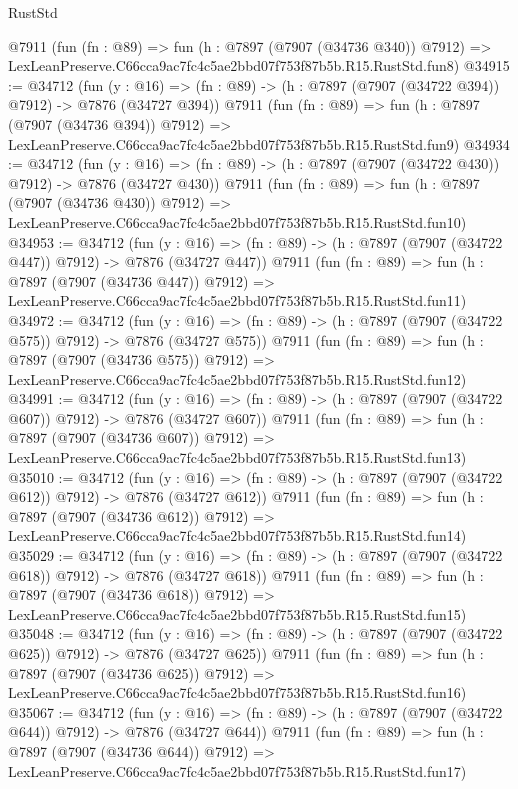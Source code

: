\begin{lexlean}{RustStd}
\begin{coremodule}
    @7911
    (fun (fn : @89) =>
    fun (h : @7897 (@7907 (@34736 @340)) @7912) =>
    LexLeanPreserve.C66cca9ac7fc4c5ae2bbd07f753f87b5b.R15.RustStd.fun8)
@34915 := @34712
    (fun (y : @16) => (fn : @89) -> (h : @7897 (@7907 (@34722 @394)) @7912) -> @7876 (@34727 @394))
    @7911
    (fun (fn : @89) =>
    fun (h : @7897 (@7907 (@34736 @394)) @7912) =>
    LexLeanPreserve.C66cca9ac7fc4c5ae2bbd07f753f87b5b.R15.RustStd.fun9)
@34934 := @34712
    (fun (y : @16) => (fn : @89) -> (h : @7897 (@7907 (@34722 @430)) @7912) -> @7876 (@34727 @430))
    @7911
    (fun (fn : @89) =>
    fun (h : @7897 (@7907 (@34736 @430)) @7912) =>
    LexLeanPreserve.C66cca9ac7fc4c5ae2bbd07f753f87b5b.R15.RustStd.fun10)
@34953 := @34712
    (fun (y : @16) => (fn : @89) -> (h : @7897 (@7907 (@34722 @447)) @7912) -> @7876 (@34727 @447))
    @7911
    (fun (fn : @89) =>
    fun (h : @7897 (@7907 (@34736 @447)) @7912) =>
    LexLeanPreserve.C66cca9ac7fc4c5ae2bbd07f753f87b5b.R15.RustStd.fun11)
@34972 := @34712
    (fun (y : @16) => (fn : @89) -> (h : @7897 (@7907 (@34722 @575)) @7912) -> @7876 (@34727 @575))
    @7911
    (fun (fn : @89) =>
    fun (h : @7897 (@7907 (@34736 @575)) @7912) =>
    LexLeanPreserve.C66cca9ac7fc4c5ae2bbd07f753f87b5b.R15.RustStd.fun12)
@34991 := @34712
    (fun (y : @16) => (fn : @89) -> (h : @7897 (@7907 (@34722 @607)) @7912) -> @7876 (@34727 @607))
    @7911
    (fun (fn : @89) =>
    fun (h : @7897 (@7907 (@34736 @607)) @7912) =>
    LexLeanPreserve.C66cca9ac7fc4c5ae2bbd07f753f87b5b.R15.RustStd.fun13)
@35010 := @34712
    (fun (y : @16) => (fn : @89) -> (h : @7897 (@7907 (@34722 @612)) @7912) -> @7876 (@34727 @612))
    @7911
    (fun (fn : @89) =>
    fun (h : @7897 (@7907 (@34736 @612)) @7912) =>
    LexLeanPreserve.C66cca9ac7fc4c5ae2bbd07f753f87b5b.R15.RustStd.fun14)
@35029 := @34712
    (fun (y : @16) => (fn : @89) -> (h : @7897 (@7907 (@34722 @618)) @7912) -> @7876 (@34727 @618))
    @7911
    (fun (fn : @89) =>
    fun (h : @7897 (@7907 (@34736 @618)) @7912) =>
    LexLeanPreserve.C66cca9ac7fc4c5ae2bbd07f753f87b5b.R15.RustStd.fun15)
@35048 := @34712
    (fun (y : @16) => (fn : @89) -> (h : @7897 (@7907 (@34722 @625)) @7912) -> @7876 (@34727 @625))
    @7911
    (fun (fn : @89) =>
    fun (h : @7897 (@7907 (@34736 @625)) @7912) =>
    LexLeanPreserve.C66cca9ac7fc4c5ae2bbd07f753f87b5b.R15.RustStd.fun16)
@35067 := @34712
    (fun (y : @16) => (fn : @89) -> (h : @7897 (@7907 (@34722 @644)) @7912) -> @7876 (@34727 @644))
    @7911
    (fun (fn : @89) =>
    fun (h : @7897 (@7907 (@34736 @644)) @7912) =>
    LexLeanPreserve.C66cca9ac7fc4c5ae2bbd07f753f87b5b.R15.RustStd.fun17)

\end{coremodule}
\end{lexlean}
